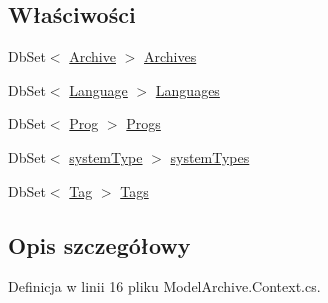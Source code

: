 \subsection*{Właściwości}
\begin{DoxyCompactItemize}
\item 
Db\+Set$<$ \hyperlink{class_smart__install_1_1_archive}{Archive} $>$ \hyperlink{class_smart__install_1_1_archive_base_entities2_a405bbf0b59d84859ee55e7667f9914eb}{Archives}
\item 
Db\+Set$<$ \hyperlink{class_smart__install_1_1_language}{Language} $>$ \hyperlink{class_smart__install_1_1_archive_base_entities2_aa44a1546a9fbf51f1c599f772e8a1aa3}{Languages}
\item 
Db\+Set$<$ \hyperlink{class_smart__install_1_1_prog}{Prog} $>$ \hyperlink{class_smart__install_1_1_archive_base_entities2_a70a23976dcecf46e3f71b19e6a02a723}{Progs}
\item 
Db\+Set$<$ \hyperlink{class_smart__install_1_1system_type}{system\+Type} $>$ \hyperlink{class_smart__install_1_1_archive_base_entities2_a2d740959abb28124acc90d6a8eb4fdd9}{system\+Types}
\item 
Db\+Set$<$ \hyperlink{class_smart__install_1_1_tag}{Tag} $>$ \hyperlink{class_smart__install_1_1_archive_base_entities2_aec8c3eec718e967babe00f42e4988996}{Tags}
\end{DoxyCompactItemize}


\subsection{Opis szczegółowy}


Definicja w linii 16 pliku Model\+Archive.\+Context.\+cs.



